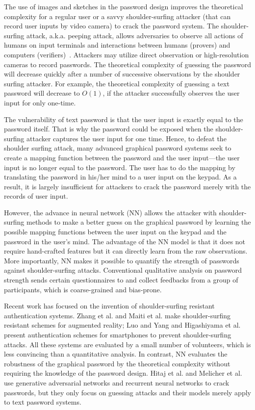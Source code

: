 \documentclass{article}
\begin{document}
The use of images and sketches in the password design improves the theoretical complexity for a regular user or a savvy shoulder-surfing attacker (that can record user inputs by video camera) to crack the password system. The shoulder-surfing attack, a.k.a. peeping attack, allows adversaries to observe all actions of humans on input terminals and interactions between humans (provers) and computers (verifiers)~\cite{DBLP:journals/iacr/LiS05,DBLP:journals/cacm/Anderson94a}. Attackers may utilize direct observation or high-resolution cameras to record passwords. The theoretical complexity of guessing the password will decrease quickly after a number of successive observations by the shoulder surfing attacker. For example, the theoretical complexity of guessing a text password will decrease to $O(1)$, if the attacker successfully observes the user input for only one-time.

The vulnerability of text password is that the user input is exactly equal to the password itself. That is why the password could be exposed when the shoulder-surfing attacker captures the user input for one time.
Hence, to defeat the shoulder surfing attack, many advanced graphical password systems seek to create a mapping function between the password and the user input---the user input is no longer equal to the password. The user has to do the mapping by translating the password in his/her mind to a user input on the keypad. As a result, it is largely insufficient for attackers to crack the password merely with the records of user input.


However, the advance in neural network (NN) allows the attacker with shoulder-surfing methods to make a better guess on the graphical password by learning the possible mapping functions between the user input on the keypad and the password in the user's mind. The advantage of the NN model is that it does not require hand-crafted features but it can directly learn from the raw observations. More importantly, NN makes it possible to quantify the strength of passwords against shoulder-surfing attacks. Conventional qualitative analysis on password strength sends certain questionnaires to and collect feedbacks from a group of participants, which is coarse-grained and bias-prone. 

Recent work has focused on the invention of shoulder-surfing resistant authentication systems. Zhang et al. \cite{DBLPHK17} and Maiti et al. \cite{DBLPJW17} make shoulder-surfing resistant schemes for augmented reality; Luo and Yang \cite{DBLP:journals/mta/LuoY16} and Higashiyama et al. \cite{DBLPOF15} present authentication schemes for smartphones to prevent shoulder-surfing attacks. All these systems are evaluated by a small number of volunteers, which is less convincing than a quantitative analysis. In contrast, NN evaluates the robustness of the graphical password by the theoretical complexity without requiring the knowledge of the password design. Hitaj et al. \cite{DBLP:journals/corr/abs-1709-00440} and Melicher et al. \cite{DBLP:conf/uss/MelicherUSKBCC16} use generative adversarial networks \cite{DBLP:journals/corr/GoodfellowPMXWOCB14} and recurrent neural networks to crack passwords, but they only focus on guessing attacks and their models merely apply to text password systems.
\end{document}
